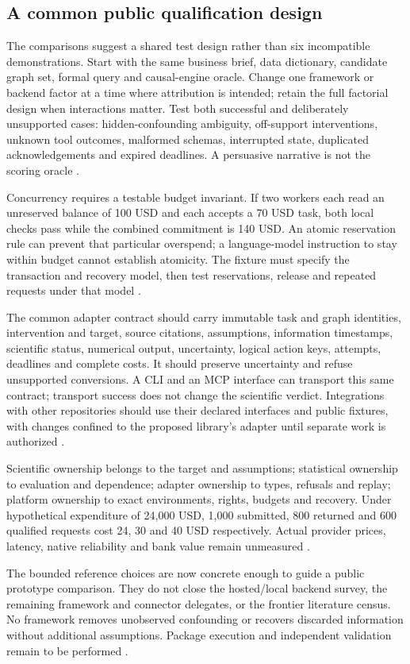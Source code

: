 \subsection{A common public qualification design}
The comparisons suggest a shared test design rather than six incompatible
demonstrations. Start with the same business brief, data dictionary,
candidate graph set, formal query and causal-engine oracle. Change one
framework or backend factor at a time where attribution is intended;
retain the full factorial design when interactions matter. Test both
successful and deliberately unsupported cases: hidden-confounding
ambiguity, off-support interventions, unknown tool outcomes, malformed
schemas, interrupted state, duplicated acknowledgements and expired
deadlines. A persuasive narrative is not the scoring oracle
\cite{exec24_framework_contracts}.

Concurrency requires a testable budget invariant. If two workers each
read an unreserved balance of 100 USD and each accepts a 70 USD task,
both local checks pass while the combined commitment is 140 USD.
An atomic reservation rule can prevent that particular overspend;
a language-model instruction to stay within budget cannot establish
atomicity. The fixture must specify the transaction and recovery model,
then test reservations, release and repeated requests under that model
\cite{exec24_framework_contracts}.

The common adapter contract should carry immutable task and graph
identities, intervention and target, source citations, assumptions,
information timestamps, scientific status, numerical output, uncertainty,
logical action keys, attempts, deadlines and complete costs. It should
preserve uncertainty and refuse unsupported conversions. A CLI and an MCP
interface can transport this same contract; transport success does not
change the scientific verdict. Integrations with other repositories should
use their declared interfaces and public fixtures, with changes confined
to the proposed library's adapter until separate work is authorized
\cite{exec24_framework_contracts}.

Scientific ownership belongs to the target and assumptions; statistical
ownership to evaluation and dependence; adapter ownership to types,
refusals and replay; platform ownership to exact environments, rights,
budgets and recovery. Under hypothetical expenditure of 24,000 USD,
1,000 submitted, 800 returned and 600 qualified requests cost 24, 30 and
40 USD respectively. Actual provider prices, latency, native reliability
and bank value remain unmeasured
\cite{exec24_framework_contracts}.

The bounded reference choices are now concrete enough to guide a public
prototype comparison. They do not close the hosted/local backend survey,
the remaining framework and connector delegates, or the frontier literature
census. No framework removes unobserved confounding or recovers discarded
information without additional assumptions. Package execution and independent validation remain to be performed
\cite{exec24_framework_contracts}.
